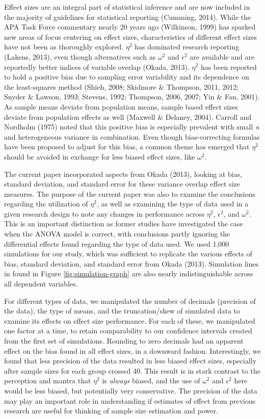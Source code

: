 \documentclass[english,man]{apa6}
\theoremstyle{definition}
\theoremstyle{definition}
\theoremstyle{definition}
\theoremstyle{remark}
\begin{document}
Effect sizes are an integral part of statistical inference and are now
included in the majority of guidelines for statistical reporting
(Cumming, 2014). While the APA Task Force commentary nearly 20 years ago
(Wilkinson, 1999) has sparked new areas of focus centering on effect
sizes, characteristics of different effect sizes have not been as
thoroughly explored. \(\eta^2\) has dominated research reporting
(Lakens, 2013), even though alternatives such as \(\omega^2\) and
\(\epsilon^2\) are available and are reportedly better indices of
variable overlap (Okada, 2013). \(\eta^2\) has been reported to hold a
positive bias due to sampling error variability and its dependence on
the least-squares method (Shieh, 2008; Skidmore \& Thompson, 2011, 2012;
Snyder \& Lawson, 1993; Stevens, 1992; Thompson, 2006, 2007; Yin \& Fan,
2001). As sample means deviate from population means, sample based
effect sizes deviate from population effects as well (Maxwell \&
Delaney, 2004). Carroll and Nordholm (1975) noted that this positive
bias is especially prevalent with small \emph{n} and heterogeneous
variance in combination. Even though bias-correcting formulas have been
proposed to adjust for this bias, a common theme has emerged that
\(\eta^2\) should be avoided in exchange for less biased effect sizes,
like \(\omega^2\).

The current paper incorporated aspects from Okada (2013), looking at
bias, standard deviation, and standard error for these variance overlap
effect size measures. The purpose of the current paper was also to
examine the conclusions regarding the utilization of \(\eta^2\), as well
as examining the type of data used in a given research design to note
any changes in performance across \(\eta^2\), \(\epsilon^2\), and
\(\omega^2\). This is an important distinction as former studies have
investigated the case when the ANOVA model is correct, with conclusions
partly ignoring the differential effects found regarding the type of
data used. We used 1,000 simulations for our study, which was sufficient
to replicate the various effects of bias, standard deviation, and
standard error from Okada (2013). Simulation lines in found in Figure
\ref{fig:simulation-graph} are also nearly indistinguishable across all
dependent variables.

For different types of data, we manipulated the number of decimals
(precision of the data), the type of means, and the truncation/skew of
simulated data to examine its effects on effect size performance. For
each of these, we manipulated one factor at a time, to retain
comparability to our confidence intervals created from the first set of
simulations. Rounding to zero decimals had an apparent effect on the
bias found in all effect sizes, in a downward fashion. Interestingly, we
found that less precision of the data resulted in less biased effect
sizes, especially after sample sizes for each group crossed 40. This
result is in stark contrast to the perception and mantra that \(\eta^2\)
is \emph{always} biased, and the use of \(\omega^2\) and \(\epsilon^2\)
here would be less biased, but potentially very conservative. The
precision of the data may play an important role in understanding if
estimates of effect from previous research are useful for thinking of
sample size estimation and power.
\end{document}

